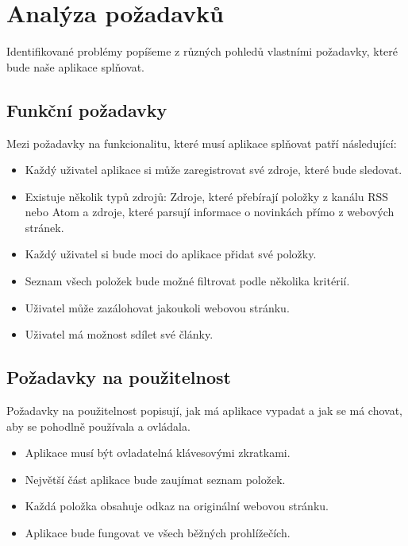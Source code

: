 \section{Analýza požadavků}

Identifikované problémy popíšeme z různých pohledů vlastními požadavky, které bude naše aplikace splňovat.

\subsection{Funkční požadavky}

Mezi požadavky na funkcionalitu, které musí aplikace splňovat patří následující:

\begin{itemize}
    \item Každý uživatel aplikace si může zaregistrovat své zdroje, které bude sledovat.
    \item Existuje několik typů zdrojů: Zdroje, které přebírají položky z kanálu RSS nebo Atom a zdroje, které parsují informace o novinkách přímo z webových stránek.
    \item Každý uživatel si bude moci do aplikace přidat své položky.
    \item Seznam všech položek bude možné filtrovat podle několika kritérií.
	\item Uživatel může zazálohovat jakoukoli webovou stránku.
	\item Uživatel má možnost sdílet své články.
\end{itemize}

\subsection{Požadavky na použitelnost}

Požadavky na použitelnost popisují, jak má aplikace vypadat a jak se má chovat, aby se pohodlně používala a ovládala.

\begin{itemize}
    \item Aplikace musí být ovladatelná klávesovými zkratkami.
    \item Největší část aplikace bude zaujímat seznam položek.
    \item Každá položka obsahuje odkaz na originální webovou stránku.
    \item Aplikace bude fungovat ve všech běžných prohlížečích.
\end{itemize}

